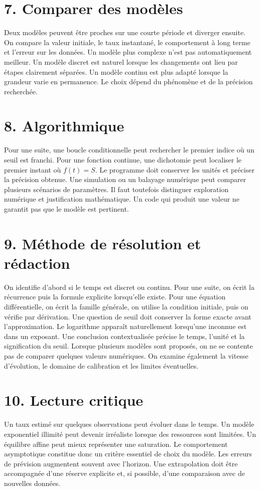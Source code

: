 \section{7. Comparer des modèles}
Deux modèles peuvent être proches sur une courte période et diverger ensuite. On compare la valeur initiale, le taux instantané, le comportement à long terme et l'erreur sur les données. Un modèle plus complexe n'est pas automatiquement meilleur.
Un modèle discret est naturel lorsque les changements ont lieu par étapes clairement séparées. Un modèle continu est plus adapté lorsque la grandeur varie en permanence. Le choix dépend du phénomène et de la précision recherchée.
\section{8. Algorithmique}
Pour une suite, une boucle conditionnelle peut rechercher le premier indice où un seuil est franchi. Pour une fonction continue, une dichotomie peut localiser le premier instant où $f(t)=S$. Le programme doit conserver les unités et préciser la précision obtenue.
Une simulation ou un balayage numérique peut comparer plusieurs scénarios de paramètres. Il faut toutefois distinguer exploration numérique et justification mathématique. Un code qui produit une valeur ne garantit pas que le modèle est pertinent.
\section{9. Méthode de résolution et rédaction}
On identifie d'abord si le temps est discret ou continu. Pour une suite, on écrit la récurrence puis la formule explicite lorsqu'elle existe. Pour une équation différentielle, on écrit la famille générale, on utilise la condition initiale, puis on vérifie par dérivation.
Une question de seuil doit conserver la forme exacte avant l'approximation. Le logarithme apparaît naturellement lorsqu'une inconnue est dans un exposant. Une conclusion contextualisée précise le temps, l'unité et la signification du seuil.
Lorsque plusieurs modèles sont proposés, on ne se contente pas de comparer quelques valeurs numériques. On examine également la vitesse d'évolution, le domaine de calibration et les limites éventuelles.
\section{10. Lecture critique}
Un taux estimé sur quelques observations peut évoluer dans le temps. Un modèle exponentiel illimité peut devenir irréaliste lorsque des ressources sont limitées. Un équilibre affine peut mieux représenter une saturation. Le comportement asymptotique constitue donc un critère essentiel de choix du modèle.
Les erreurs de prévision augmentent souvent avec l'horizon. Une extrapolation doit être accompagnée d'une réserve explicite et, si possible, d'une comparaison avec de nouvelles données.
